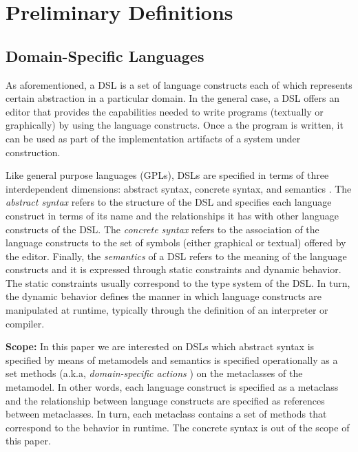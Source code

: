 \section{Preliminary Definitions}
\label{sec:background}

\subsection{Domain-Specific Languages}

As aforementioned, a DSL is a set of language constructs each of which represents certain abstraction in a particular domain. In the general case, a DSL offers an editor that provides the capabilities needed to write programs (textually or graphically) by using the language constructs. Once a the program is written, it can be used as part of the implementation artifacts of a system under construction. 

Like general purpose languages (GPLs), DSLs are specified in terms of three interdependent dimensions: abstract syntax, concrete syntax, and semantics \cite{Harel:2004b}. The \textit{abstract syntax} refers to the structure of the DSL and specifies each language construct in terms of its name and the relationships it has with other language constructs of the DSL. The \textit{concrete syntax} refers to the association of the language constructs to the set of symbols (either graphical or textual) offered by the editor. Finally, the \textit{semantics} of a DSL refers to the meaning of the language constructs and it is expressed through static constraints and dynamic behavior. The static constraints usually correspond to the type system of the DSL. In turn, the dynamic behavior defines the manner in which language constructs are manipulated at runtime, typically through the definition of an interpreter or compiler.

\textbf{Scope:} In this paper we are interested on DSLs which abstract syntax is specified by means of metamodels and semantics is specified operationally as a set  methods (a.k.a, \textit{domain-specific actions} \cite{Combemale:2013}) on the metaclasses of the metamodel. In other words, each language construct is specified as a metaclass and the relationship between language constructs are specified as references between metaclasses. In turn, each metaclass contains a set of methods that correspond to the behavior in runtime. The concrete syntax is out of the scope of this paper. 


